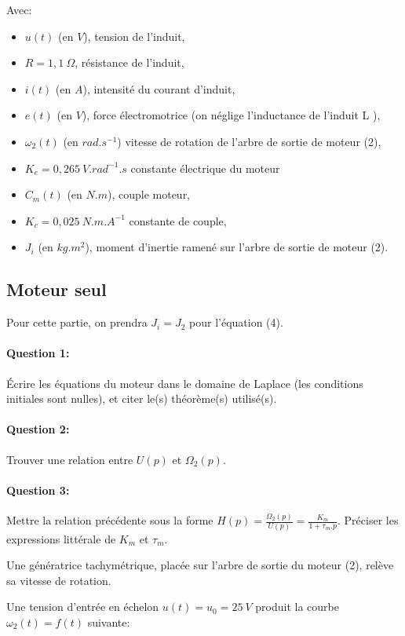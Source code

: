 Avec:
\begin{itemize}
 \item $u(t)$ (en $V$), tension de l'induit,
 \item $R=1,1\ \Omega$, résistance de l'induit,
 \item $i(t)$ (en $A$), intensité du courant d'induit,
 \item $e(t)$ (en $V$), force électromotrice (on néglige l'inductance de l'induit L ),
 \item $\omega_2(t)$ (en $rad.s^{-1}$) vitesse de rotation de l'arbre de sortie de moteur (2),
 \item $K_e=0,265\ V.rad^{-1}.s$ constante électrique du moteur
 \item $C_m(t)$ (en $N.m$), couple moteur,
 \item $K_c=0,025\ N.m.A^{-1}$ constante de couple,
 \item $J_i$ (en $kg.m^2$), moment d'inertie ramené sur l'arbre de sortie de moteur (2).
\end{itemize}

\subsection{Moteur seul}

Pour cette partie, on prendra $J_i=J_2$ pour l'équation (4).

\paragraph{Question 1:} Écrire les équations du moteur dans le domaine de Laplace (les conditions initiales sont nulles), et citer le(s) théorème(s) utilisé(s).

\paragraph{Question 2:} Trouver une relation entre $U(p)$ et $\Omega_2(p)$.

\paragraph{Question 3:} Mettre la relation précédente sous la forme
$H(p)=\frac{\Omega_2(p)}{U(p)}=\frac{K_m}{1+\tau_m.p}$. Préciser les expressions littérale de $K_m$ et $\tau_m$.

Une génératrice tachymétrique, placée sur l'arbre de sortie du moteur (2), relève sa vitesse de rotation.

Une tension d'entrée en échelon $u(t)=u_0=25\ V$ produit la courbe $\omega_2(t)=f(t)$ suivante:

